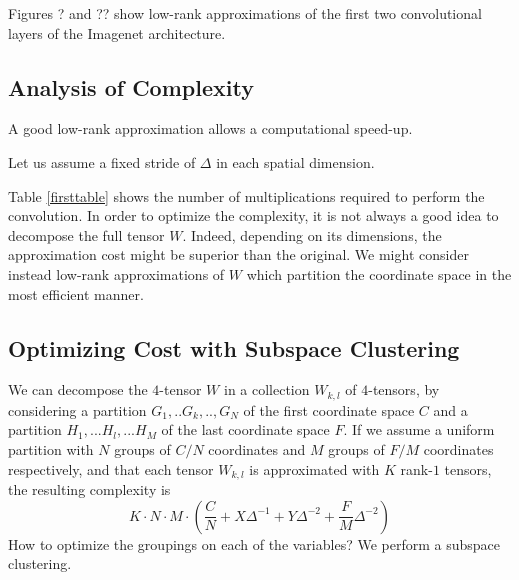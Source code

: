 \documentclass{article}
\begin{document}
Figures ? and ?? show low-rank approximations of the first two convolutional
layers of the Imagenet architecture.


\subsection{Analysis of Complexity}

A good low-rank approximation allows a computational speed-up. 

Let us assume a fixed stride of $\Delta$ in each spatial dimension. 


Table \ref{firsttable} shows the number of multiplications required to perform the 
convolution. In order to optimize the complexity, it is not always a good idea 
to decompose the full tensor $W$. Indeed, depending on its dimensions, 
the approximation cost might be superior than the original.
We might consider instead low-rank approximations of $W$ 
which partition the coordinate space in the most efficient manner.

\subsection{Optimizing Cost with Subspace Clustering}

We can decompose the $4$-tensor $W$ in a collection $W_{k,l}$ of $4$-tensors, 
by considering a partition $G_1,..G_k,..,G_N$ of the first coordinate space $C$ and
a partition $H_1,...H_l,...H_M$ of the last coordinate space $F$. 
 If we assume a uniform partition with $N$ groups of $C/N$ coordinates and 
 $M$ groups of $F/M$ coordinates respectively, and that each tensor $W_{k,l}$ 
 is approximated with $K$ rank-$1$ tensors, the resulting complexity is 
\begin{equation*}
 K \cdot N \cdot M \cdot \left( \frac{C}{N} + X \Delta^{-1} + Y \Delta^{-2} + \frac{F}{M} \Delta^{-2}\right)
\end{equation*}
 How to optimize the groupings on each of the variables? We perform a subspace clustering. 
 
\end{document}
